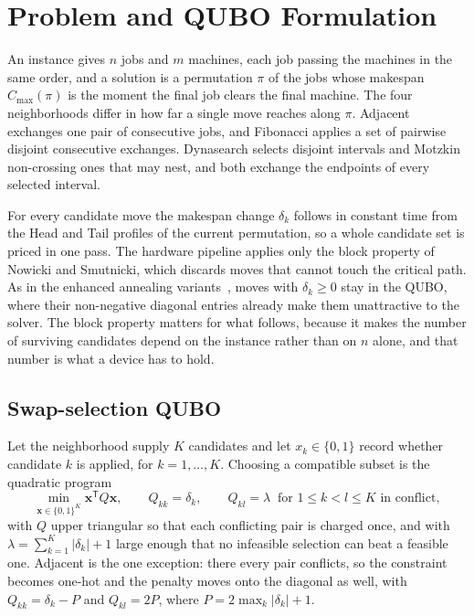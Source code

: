 \documentclass[runningheads]{llncs}
\begin{document}
\section{Problem and QUBO Formulation}
\label{sec:method}
An instance gives $n$ jobs and $m$ machines, each job passing the machines in
the same order, and a solution is a permutation $\pi$ of the jobs whose
makespan $C_{\max}(\pi)$ is the moment the final job clears the final
machine. The four neighborhoods differ in how far a single move reaches along $\pi$.
Adjacent exchanges one pair of consecutive jobs, and Fibonacci applies a set of
pairwise disjoint consecutive exchanges. Dynasearch selects disjoint
intervals and Motzkin non-crossing ones that may nest, and both exchange the
endpoints of every selected interval. 

For every candidate move the makespan change $\delta_k$ follows in constant
time from the Head and Tail profiles of the current permutation, so a whole
candidate set is priced in one pass. The hardware pipeline applies only the block property of Nowicki and Smutnicki, which discards moves that cannot touch the critical path. As in the enhanced
annealing variants~\cite{wojewodzki2026windowed}, moves with $\delta_k \ge 0$
stay in the QUBO, where their
non-negative diagonal entries already make them unattractive to the solver.
The block property matters for what follows, because it makes the number of
surviving candidates depend on the instance rather than on $n$ alone, and that
number is what a device has to hold.

\subsection{Swap-selection QUBO}
\label{subsec:qubo}
Let the neighborhood supply $K$ candidates and let $x_k \in \{0,1\}$ record
whether candidate $k$ is applied, for $k = 1, \dots, K$. Choosing a compatible
subset is the quadratic program
\begin{equation}
  \min_{\mathbf{x} \in \{0,1\}^{K}} \mathbf{x}^{\mathsf T} Q \mathbf{x},
  \qquad Q_{kk} = \delta_k, \qquad
  Q_{kl} = \lambda \ \text{ for } 1 \le k < l \le K \text{ in conflict},
  \label{eq:qubo}
\end{equation}
with $Q$ upper triangular so that each conflicting pair is charged once, and
with $\lambda = \sum_{k=1}^{K} \lvert \delta_k \rvert + 1$ large enough that no
infeasible selection can beat a feasible one. Adjacent is the one exception:
there every pair conflicts, so the constraint becomes one-hot and the penalty
moves onto the diagonal as well, with $Q_{kk} = \delta_k - P$ and
$Q_{kl} = 2P$, where $P = 2\max_k \lvert \delta_k \rvert + 1$.
\end{document}
